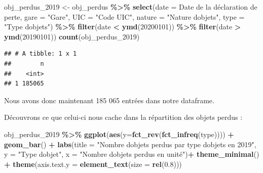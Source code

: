 \documentclass[
]{article}
\newenvironment{Shaded}{\begin{snugshade}}{\end{snugshade}}
\newcommand{\AttributeTok}[1]{\textcolor[rgb]{0.13,0.29,0.53}{#1}}
\newcommand{\DecValTok}[1]{\textcolor[rgb]{0.00,0.00,0.81}{#1}}
\newcommand{\FloatTok}[1]{\textcolor[rgb]{0.00,0.00,0.81}{#1}}
\newcommand{\FunctionTok}[1]{\textcolor[rgb]{0.13,0.29,0.53}{\textbf{#1}}}
\newcommand{\NormalTok}[1]{#1}
\newcommand{\OtherTok}[1]{\textcolor[rgb]{0.56,0.35,0.01}{#1}}
\newcommand{\SpecialCharTok}[1]{\textcolor[rgb]{0.81,0.36,0.00}{\textbf{#1}}}
\newcommand{\StringTok}[1]{\textcolor[rgb]{0.31,0.60,0.02}{#1}}
\begin{document}
\begin{Shaded}
\begin{Highlighting}[]
\NormalTok{obj\_perdus\_2019 }\OtherTok{\textless{}{-}}\NormalTok{ obj\_perdus }\SpecialCharTok{\%\textgreater{}\%}
  \FunctionTok{select}\NormalTok{(}\AttributeTok{date =} \StringTok{\textasciigrave{}}\AttributeTok{Date de la déclaration de perte}\StringTok{\textasciigrave{}}\NormalTok{, }\AttributeTok{gare =} \StringTok{"Gare"}\NormalTok{, }\AttributeTok{UIC =} \StringTok{"Code UIC"}\NormalTok{, }\AttributeTok{nature =} \StringTok{"Nature d\textquotesingle{}objets"}\NormalTok{, }\AttributeTok{type =} \StringTok{"Type d\textquotesingle{}objets"}\NormalTok{) }\SpecialCharTok{\%\textgreater{}\%}
  \FunctionTok{filter}\NormalTok{(date }\SpecialCharTok{\textless{}} \FunctionTok{ymd}\NormalTok{(}\DecValTok{20200101}\NormalTok{)) }\SpecialCharTok{\%\textgreater{}\%} 
  \FunctionTok{filter}\NormalTok{(date }\SpecialCharTok{\textgreater{}} \FunctionTok{ymd}\NormalTok{(}\DecValTok{20190101}\NormalTok{))}
\FunctionTok{count}\NormalTok{(obj\_perdus\_2019)}
\end{Highlighting}
\end{Shaded}

\begin{verbatim}
## # A tibble: 1 x 1
##        n
##    <int>
## 1 185065
\end{verbatim}

Nous avons donc maintenant 185 065 entrées dans notre dataframe.

Découvrons ce que celui-ci nous cache dans la répartition des objets
perdus :

\begin{Shaded}
\begin{Highlighting}[]
\NormalTok{obj\_perdus\_2019 }\SpecialCharTok{\%\textgreater{}\%} 
  \FunctionTok{ggplot}\NormalTok{(}\FunctionTok{aes}\NormalTok{(}\AttributeTok{y=}\FunctionTok{fct\_rev}\NormalTok{(}\FunctionTok{fct\_infreq}\NormalTok{(type)))) }\SpecialCharTok{+}
  \FunctionTok{geom\_bar}\NormalTok{() }\SpecialCharTok{+}
  \FunctionTok{labs}\NormalTok{(}\AttributeTok{title =} \StringTok{"Nombre d\textquotesingle{}objets perdus par type d\textquotesingle{}objets en 2019"}\NormalTok{,}
       \AttributeTok{y =} \StringTok{"Type d\textquotesingle{}objet"}\NormalTok{,}
       \AttributeTok{x =} \StringTok{"Nombre d\textquotesingle{}objets perdus en unité"}\NormalTok{)}\SpecialCharTok{+}
  \FunctionTok{theme\_minimal}\NormalTok{() }\SpecialCharTok{+}
  \FunctionTok{theme}\NormalTok{(}\AttributeTok{axis.text.y =} \FunctionTok{element\_text}\NormalTok{(}\AttributeTok{size =} \FunctionTok{rel}\NormalTok{(}\FloatTok{0.8}\NormalTok{)))}
\end{Highlighting}
\end{Shaded}
\end{document}
